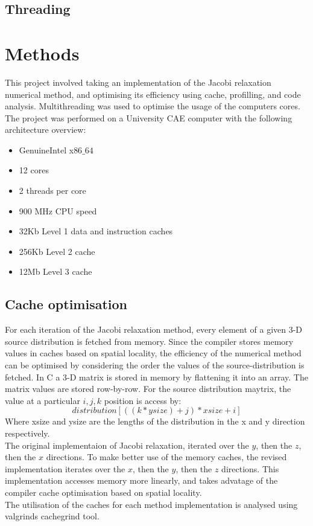 \documentclass[a4paper, 12pt]{article}
\begin{document}
\subsection{Threading}


\section{Methods}
	This project involved taking an implementation of the Jacobi relaxation numerical method, and optimising its efficiency using cache, profilling, and code analysis. Multithreading was used to optimise the usage of the computers cores. 
	\\
	The project was performed on a University CAE computer with the following architecture overview:
	\begin{itemize}
		\item GenuineIntel x$86\_64$
		\item 12 cores
		\item 2 threads per core
		\item 900 MHz CPU speed
		\item 32Kb Level 1 data and instruction caches
		\item 256Kb Level 2 cache
		\item 12Mb Level 3 cache
	\end{itemize}
	

\subsection{Cache optimisation}
For each iteration of the Jacobi relaxation method, every element of a given 3-D source distribution is fetched from memory. Since the compiler stores memory values in caches based on spatial locality, the efficiency of the numerical method can be optimised by considering the order the values of the source-distribution is fetched. In C a 3-D matrix is stored in memory by flattening it into an array. The matrix values are stored row-by-row. For the source distribution maytrix, the value at a particular $i, j, k$ position is access by:
%
\begin{equation}
distribution[((k*ysize) + j)*xsize + i]
\end{equation}
%
Where xsize and ysize are the lengths of the distribution in the x and y direction respectively.
\\
The original implementaion of Jacobi relaxation, iterated over the $y$, then the $z$, then the $x$ directions. To make better use of the memory caches, the revised implementation iterates over the $x$, then the $y$, then the $z$ directions. This implementation accesses memory more linearly, and takes advatage of the compiler cache optimisation based on spatial locality. 
\\
The utilisation of the caches for each method implementation is analysed using valgrinds cachegrind tool. 
\end{document}
